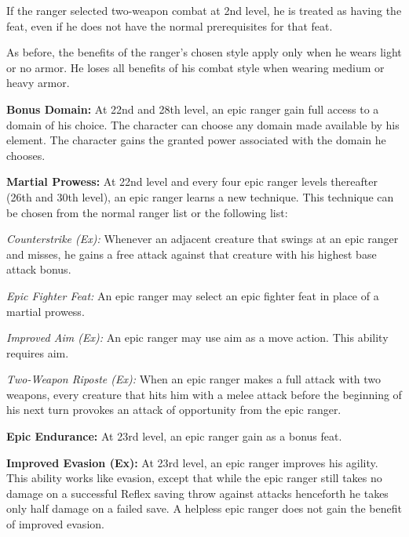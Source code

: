 If the ranger selected two-weapon combat at 2nd level, he is treated as having the  feat, even if he does not have the normal prerequisites for that feat.

As before, the benefits of the ranger's chosen style apply only when he wears light or no armor. He loses all benefits of his combat style when wearing medium or heavy armor.

\textbf{Bonus Domain:} At 22nd and 28th level, an epic ranger gain full access to a domain of his choice. The character can choose any domain made available by his element. The character gains the granted power associated with the domain he chooses.

\textbf{Martial Prowess:} At 22nd level and every four epic ranger levels thereafter (26th and 30th level), an epic ranger learns a new technique. This technique can be chosen from the normal ranger list or the following list:

\textit{Counterstrike (Ex):} Whenever an adjacent creature that swings at an epic ranger and misses, he gains a free attack against that creature with his highest base attack bonus.


\textit{Epic Fighter Feat:} An epic ranger may select an epic fighter feat in place of a martial prowess.

\textit{Improved Aim (Ex):} An epic ranger may use aim as a move action. This ability requires aim.

\textit{Two-Weapon Riposte (Ex):} When an epic ranger makes a full attack with two weapons, every creature that hits him with a melee attack before the beginning of his next turn provokes an attack of opportunity from the epic ranger.


\textbf{Epic Endurance:} At 23rd level, an epic ranger gain  as a bonus feat.

\textbf{Improved Evasion (Ex):} At 23rd level, an epic ranger improves his agility. This ability works like evasion, except that while the epic ranger still takes no damage on a successful Reflex saving throw against attacks henceforth he takes only half damage on a failed save. A helpless epic ranger does not gain the benefit of improved evasion.

